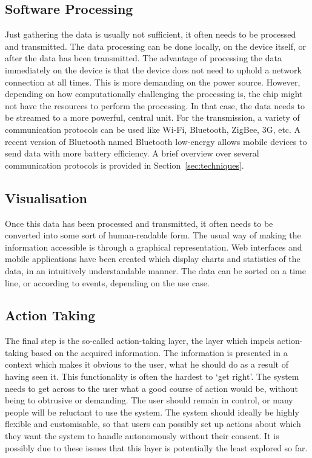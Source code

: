 \subsection{Software Processing} 
\label{sec:softwareProcessing}
Just gathering the data is usually not sufficient, it often needs to be processed and transmitted. 
The data processing can be done locally, on the device itself, or after the data has been transmitted. 
The advantage of processing the data immediately on the device is that the device does not need to uphold a network connection at all times. 
This is more demanding on the power source. 
However, depending on how computationally challenging the processing is, the chip might not have the resources to perform the processing. 
In that case, the data needs to be streamed to a more powerful, central unit. 
For the transmission, a variety of communication protocols can be used like Wi-Fi, Bluetooth, ZigBee, 3G, etc. 
A recent version of Bluetooth named Bluetooth low-energy allows mobile devices to send data with more battery efficiency. A brief overview over several communication protocols is provided in Section~\ref{sec:techniques}.

\subsection{Visualisation}
\label{sec:visualisation}
Once this data has been processed and transmitted, it often needs to be converted into some sort of human-readable form. The usual way of making the information accessible is through a graphical representation. 
Web interfaces and mobile applications have been created which display charts and statistics of the data, in an intuitively understandable manner. 
The data can be sorted on a time line, or according to events, depending on the use case.

\subsection{Action Taking}
\label{actionTaking}
The final step is the so-called action-taking layer, the layer which impels action-taking based on the acquired information. 
The information is presented in a context which makes it obvious to the user, what he should do as a result of having seen it.
This functionality is often the hardest to `get right'. 
The system needs to get across to the user what a good course of action would be, without being to obtrusive or demanding. 
The user should remain in control, or many people will be reluctant to use the system. The system should ideally be highly flexible and customisable, so that users can possibly set up actions about which they want the system to handle autonomously without their consent. It is possibly due to these issues that this layer is potentially the least explored so far.

